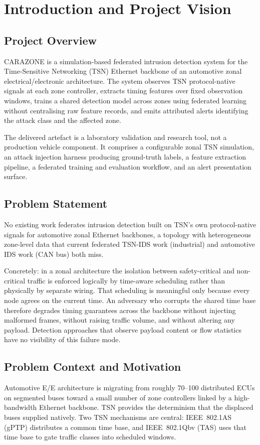 \chapter{Introduction and Project Vision}

\section{Project Overview}
CARAZONE is a simulation-based federated intrusion detection system for the
Time-Sensitive Networking (TSN) Ethernet backbone of an automotive zonal
electrical/electronic architecture. The system observes TSN protocol-native signals
at each zone controller, extracts timing features over fixed observation windows,
trains a shared detection model across zones using federated learning without
centralising raw feature records, and emits attributed alerts identifying the attack
class and the affected zone.

The delivered artefact is a laboratory validation and research tool, not a production
vehicle component. It comprises a configurable zonal TSN simulation, an attack
injection harness producing ground-truth labels, a feature extraction pipeline, a
federated training and evaluation workflow, and an alert presentation surface.

\section{Problem Statement}
No existing work federates intrusion detection built on TSN's own protocol-native
signals for automotive zonal Ethernet backbones, a topology with heterogeneous
zone-level data that current federated TSN-IDS work (industrial) and automotive IDS
work (CAN bus) both miss.

Concretely: in a zonal architecture the isolation between safety-critical and
non-critical traffic is enforced logically by time-aware scheduling rather than
physically by separate wiring. That scheduling is meaningful only because every node
agrees on the current time. An adversary who corrupts the shared time base therefore
degrades timing guarantees across the backbone without injecting malformed frames,
without raising traffic volume, and without altering any payload. Detection
approaches that observe payload content or flow statistics have no visibility of
this failure mode.

\section{Problem Context and Motivation}
\label{sec:problem-context}
Automotive E/E architecture is migrating from roughly 70--100 distributed ECUs on
segmented buses toward a small number of zone controllers linked by a high-bandwidth
Ethernet backbone. TSN provides the determinism that the displaced buses supplied
natively. Two TSN mechanisms are central: IEEE~802.1AS (gPTP) distributes a common
time base, and IEEE~802.1Qbv (TAS) uses that time base to gate traffic classes into
scheduled windows.

